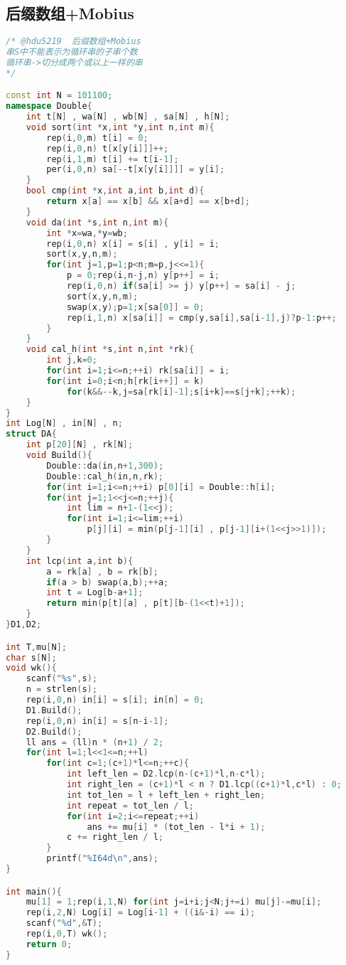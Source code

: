 \subsection{后缀数组+Mobius}
\begin{lstlisting}[language=C++]
/* @hdu5219  后缀数组+Mobius
串S中不能表示为循环串的子串个数
循环串->切分成两个或以上一样的串
*/

const int N = 101100;
namespace Double{
	int t[N] , wa[N] , wb[N] , sa[N] , h[N];
	void sort(int *x,int *y,int n,int m){
		rep(i,0,m) t[i] = 0;
		rep(i,0,n) t[x[y[i]]]++;
		rep(i,1,m) t[i] += t[i-1];
		per(i,0,n) sa[--t[x[y[i]]]] = y[i];
	}
	bool cmp(int *x,int a,int b,int d){
		return x[a] == x[b] && x[a+d] == x[b+d];
	}
	void da(int *s,int n,int m){
		int *x=wa,*y=wb;
		rep(i,0,n) x[i] = s[i] , y[i] = i;
		sort(x,y,n,m);
		for(int j=1,p=1;p<n;m=p,j<<=1){
			p = 0;rep(i,n-j,n) y[p++] = i;
			rep(i,0,n) if(sa[i] >= j) y[p++] = sa[i] - j;
			sort(x,y,n,m);
			swap(x,y);p=1;x[sa[0]] = 0;
			rep(i,1,n) x[sa[i]] = cmp(y,sa[i],sa[i-1],j)?p-1:p++;
		}
	}
	void cal_h(int *s,int n,int *rk){
		int j,k=0;
		for(int i=1;i<=n;++i) rk[sa[i]] = i;
		for(int i=0;i<n;h[rk[i++]] = k)
			for(k&&--k,j=sa[rk[i]-1];s[i+k]==s[j+k];++k);
	}
}
int Log[N] , in[N] , n;
struct DA{
	int p[20][N] , rk[N];
	void Build(){
		Double::da(in,n+1,300);
		Double::cal_h(in,n,rk);
		for(int i=1;i<=n;++i) p[0][i] = Double::h[i];
		for(int j=1;1<<j<=n;++j){
			int lim = n+1-(1<<j);
			for(int i=1;i<=lim;++i)
				p[j][i] = min(p[j-1][i] , p[j-1][i+(1<<j>>1)]);
		}
	}
	int lcp(int a,int b){
		a = rk[a] , b = rk[b];
		if(a > b) swap(a,b);++a;
		int t = Log[b-a+1];
		return min(p[t][a] , p[t][b-(1<<t)+1]);
	}
}D1,D2;

int T,mu[N];
char s[N];
void wk(){
	scanf("%s",s);
	n = strlen(s);
	rep(i,0,n) in[i] = s[i]; in[n] = 0;
	D1.Build();
	rep(i,0,n) in[i] = s[n-i-1];
	D2.Build();
	ll ans = (ll)n * (n+1) / 2;
	for(int l=1;l<<1<=n;++l)
		for(int c=1;(c+1)*l<=n;++c){
			int left_len = D2.lcp(n-(c+1)*l,n-c*l);
			int right_len = (c+1)*l < n ? D1.lcp((c+1)*l,c*l) : 0;
			int tot_len = l + left_len + right_len;
			int repeat = tot_len / l;
			for(int i=2;i<=repeat;++i)
				ans += mu[i] * (tot_len - l*i + 1);
			c += right_len / l;
		}
		printf("%I64d\n",ans);
}

int main(){
	mu[1] = 1;rep(i,1,N) for(int j=i+i;j<N;j+=i) mu[j]-=mu[i];
	rep(i,2,N) Log[i] = Log[i-1] + ((i&-i) == i);
	scanf("%d",&T);
	rep(i,0,T) wk();
	return 0;
}
\end{lstlisting}
